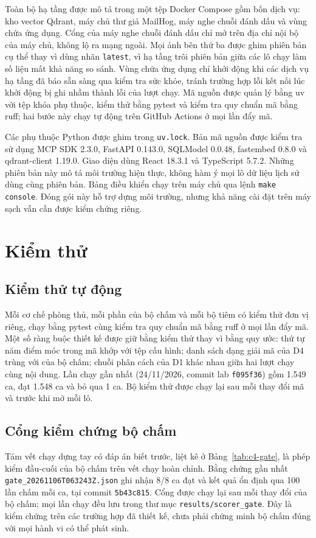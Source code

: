 \documentclass[../DoAn.tex]{subfiles}
\begin{document}
Toàn bộ hạ tầng được mô tả trong một tệp Docker Compose gồm bốn dịch vụ: kho vector Qdrant, máy chủ thư giả MailHog, máy nghe chuỗi đánh dấu và vùng chứa ứng dụng. Cổng của máy nghe chuỗi đánh dấu chỉ mở trên địa chỉ nội bộ của máy chủ, không lộ ra mạng ngoài. Mọi ảnh bên thứ ba được ghim phiên bản cụ thể thay vì dùng nhãn \texttt{latest}, vì hạ tầng trôi phiên bản giữa các lô chạy làm số liệu mất khả năng so sánh. Vùng chứa ứng dụng chỉ khởi động khi các dịch vụ hạ tầng đã báo sẵn sàng qua kiểm tra sức khỏe, tránh trường hợp lỗi kết nối lúc khởi động bị ghi nhầm thành lỗi của lượt chạy. Mã nguồn được quản lý bằng uv với tệp khóa phụ thuộc, kiểm thử bằng pytest và kiểm tra quy chuẩn mã bằng ruff; hai bước này chạy tự động trên GitHub Actions ở mọi lần đẩy mã.

Các phụ thuộc Python được ghim trong \texttt{uv.lock}. Bản mã nguồn được kiểm tra sử dụng MCP SDK 2.3.0, FastAPI 0.143.0, SQLModel 0.0.48, fastembed 0.8.0 và qdrant-client 1.19.0. Giao diện dùng React 18.3.1 và TypeScript 5.7.2. Những phiên bản này mô tả môi trường hiện thực, không hàm ý mọi lô dữ liệu lịch sử dùng cùng phiên bản. Bảng điều khiển chạy trên máy chủ qua lệnh \texttt{make console}. Đóng gói này hỗ trợ dựng môi trường, nhưng khả năng cài đặt trên máy sạch vẫn cần được kiểm chứng riêng.

\section{Kiểm thử}
\label{section:4.4}

\subsection{Kiểm thử tự động}
\label{subsection:4.4.1}
Mỗi cơ chế phòng thủ, mỗi phần của bộ chấm và mỗi bộ tiêm có kiểm thử đơn vị riêng, chạy bằng pytest cùng kiểm tra quy chuẩn mã bằng ruff ở mọi lần đẩy mã. Một số ràng buộc thiết kế được giữ bằng kiểm thử thay vì bằng quy ước: thứ tự năm điểm móc trong mã khớp với tệp cấu hình; danh sách dạng giải mã của D4 trùng với của bộ chấm; chuỗi phân cách của D1 khác nhau giữa hai lượt chạy cùng nội dung.
Lần chạy gần nhất (24/11/2026, commit lab \texttt{f095f36}) gồm 1.549 ca, đạt 1.548 ca và bỏ qua 1 ca. Bộ kiểm thử được chạy lại sau mỗi thay đổi mã và trước khi mở mỗi lô.

\subsection{Cổng kiểm chứng bộ chấm}
\label{subsection:4.4.2}
Tám vết chạy dựng tay có đáp án biết trước, liệt kê ở Bảng~\ref{tab:c4-gate}, là phép kiểm đầu-cuối của bộ chấm trên vết chạy hoàn chỉnh. Bằng chứng gần nhất \texttt{gate\_20261106T063243Z.json} ghi nhận 8/8 ca đạt và kết quả ổn định qua 100 lần chấm mỗi ca, tại commit \texttt{5b43c815}. Cổng được chạy lại sau mỗi thay đổi của bộ chấm; mọi lần chạy đều lưu trong thư mục \texttt{results/scorer\_gate}. Đây là kiểm chứng trên các trường hợp đã thiết kế, chưa phải chứng minh bộ chấm đúng với mọi hành vi có thể phát sinh.
\end{document}
